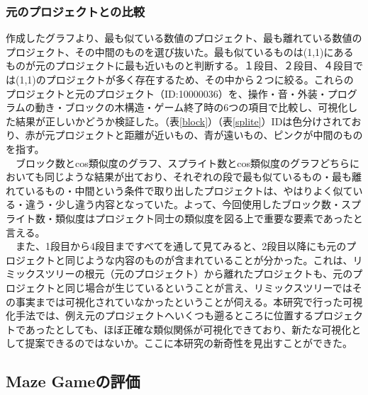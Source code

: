\documentclass[a4paper,10pt,onecolumn,oneside,openany]{jsbook}
\begin{document}
\subsubsection{元のプロジェクトとの比較}
作成したグラフより、最も似ている数値のプロジェクト、最も離れている数値のプロジェクト、その中間のものを選び抜いた。最も似ているものは(1,1)にあるものが元のプロジェクトに最も近いものと判断する。１段目、２段目、４段目では(1,1)のプロジェクトが多く存在するため、その中から２つに絞る。これらのプロジェクトと元のプロジェクト（ID:10000036）を、操作・音・外装・プログラムの動き・ブロックの木構造・ゲーム終了時の6つの項目で比較し、可視化した結果が正しいかどうか検証した。（表\ref{block}）（表\ref{splite}）IDは色分けされており、赤が元プロジェクトと距離が近いもの、青が遠いもの、ピンクが中間のものを指す。
\\
　ブロック数とcos類似度のグラフ、スプライト数とcos類似度のグラフどちらにおいても同じような結果が出ており、それぞれの段で最も似ているもの・最も離れているもの・中間という条件で取り出したプロジェクトは、やはりよく似ている・違う・少し違う内容となっていた。よって、今回使用したブロック数・スプライト数・類似度はプロジェクト同士の類似度を図る上で重要な要素であったと言える。
\\
　また、1段目から4段目まですべてを通して見てみると、2段目以降にも元のプロジェクトと同じような内容のものが含まれていることが分かった。これは、リミックスツリーの根元（元のプロジェクト）から離れたプロジェクトも、元のプロジェクトと同じ場合が生じているということが言え、リミックスツリーではその事実までは可視化されていなかったということが伺える。本研究で行った可視化手法では、例え元のプロジェクトへいくつも遡るところに位置するプロジェクトであったとしても、ほぼ正確な類似関係が可視化できており、新たな可視化として提案できるのではないか。ここに本研究の新奇性を見出すことができた。

\newpage
\subsection{Maze Gameの評価}
\end{document}
